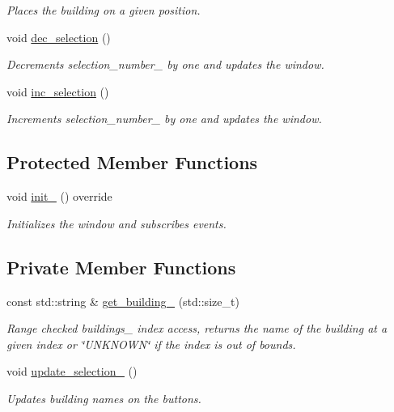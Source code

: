 \begin{DoxyCompactItemize}
\begin{DoxyCompactList}\small\item\em Places the building on a given position. \end{DoxyCompactList}\item 
void \hyperlink{class_builder_window_a648d7e9097ccaf913c047ab5a6654049}{dec\+\_\+selection} ()
\begin{DoxyCompactList}\small\item\em Decrements selection\+\_\+number\+\_\+ by one and updates the window. \end{DoxyCompactList}\item 
void \hyperlink{class_builder_window_ae74b14919ee458c9a241454233437428}{inc\+\_\+selection} ()
\begin{DoxyCompactList}\small\item\em Increments selection\+\_\+number\+\_\+ by one and updates the window. \end{DoxyCompactList}\end{DoxyCompactItemize}
\subsection*{Protected Member Functions}
\begin{DoxyCompactItemize}
\item 
void \hyperlink{class_builder_window_aadd9fb46ddd55ce86bff0f012f56f2e8}{init\+\_\+} () override
\begin{DoxyCompactList}\small\item\em Initializes the window and subscribes events. \end{DoxyCompactList}\end{DoxyCompactItemize}
\subsection*{Private Member Functions}
\begin{DoxyCompactItemize}
\item 
const std\+::string \& \hyperlink{class_builder_window_a1218facb3b07955dc9335e33cbf34031}{get\+\_\+building\+\_\+} (std\+::size\+\_\+t)
\begin{DoxyCompactList}\small\item\em Range checked buildings\+\_\+ index access, returns the name of the building at a given index or \char`\"{}\+U\+N\+K\+N\+O\+W\+N\char`\"{} if the index is out of bounds. \end{DoxyCompactList}\item 
void \hyperlink{class_builder_window_af0bd0684025576217acb9ddca8ee7377}{update\+\_\+selection\+\_\+} ()
\begin{DoxyCompactList}\small\item\em Updates building names on the buttons. \end{DoxyCompactList}\end{DoxyCompactItemize}
